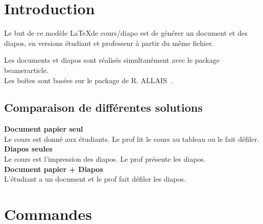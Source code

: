 \documentclass[b,e,cours]{D:/hubiC/GitHub/test_Baggio/paquets/classe_kara}
\begin{document}
\newcommand*{\partie}{Modèles}
\newcommand*{\titre}{Modèle de cours}
\newcommand*{\numero}{-1}
\newcommand*{\prerequis}{\item Prérequis}
\newcommand*{\connaissances}{\item connaissance}
\newcommand*{\savoirfaire}{\item savoirfaire}
\newcommand*{\organisation}{\item Organisation}
\newcommand*{\afaire}{\item gérer les références.}





\section{Introduction}
\begin{frame}
Le but de ce modèle \LaTeX de cours/diapo est de générer un document et des diapos, en versions étudiant et professeur à partir du même fichier.
\end{frame}
\begin{frame}
Les documents et diapos sont réalisés simultanément avec le package beamerarticle.\\
Les boîtes sont basées sur le package de R. ALLAIS~\cite{raphaelallais}.
\end{frame}

\subsection{Comparaison de différentes solutions}
\begin{frame}
\textbf{Document papier seul}~~\\
Le cours est donné aux étudiants. Le prof lit le cours au tableau ou le fait défiler.\\
\textbf{Diapos seules}~~\\
Le cours est l'impression des diapos. Le prof présente les diapos.\\
\textbf{Document papier + Diapos}\\
L'étudiant a un document et le prof fait défiler les diapos.
\end{frame}


\section{Commandes}
\end{document}
